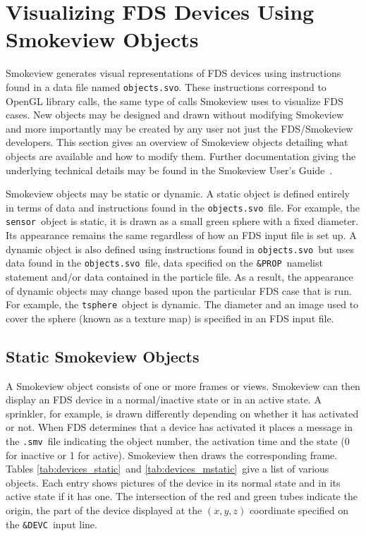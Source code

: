 %
%
\newcommand{\devicewidth}{1.5in}
\newcommand{\boxwidth}{2.75in}
\newcommand{\incgraphics}[1]{
\parbox[c]{\devicewidth}{
\vspace{0.01in}
\texttt{[image: \#1]}
\vspace{0.01in}
}
}

\section{Visualizing FDS Devices Using Smokeview Objects}
Smokeview generates visual representations of FDS devices using instructions found in a data file named
{\tt objects.svo}.  These instructions correspond to OpenGL library calls, the same type of calls Smokeview
uses to visualize FDS cases.  New objects may be designed and drawn without modifying Smokeview and more
importantly may be created by any user not just the FDS/Smokeview developers.  This section gives an overview
of Smokeview objects detailing what objects are available and how to modify them.  Further documentation
giving the underlying technical details may be found in the Smokeview User's Guide~\cite{Smokeview_Users_Guide_5}.

Smokeview objects may be static or dynamic.  A static object is defined entirely in terms of data and instructions
found in the {\tt objects.svo}\ file.  For example, the {\tt sensor}\ object is static, it is drawn as a small green
sphere with a fixed diameter.  Its appearance remains 
the same regardless of how an FDS input file is set up.  A dynamic object is also defined using instructions found in 
{\tt objects.svo}\ but uses data found in the {\tt objects.svo}\ file, data specified on the {\tt \&PROP}\ namelist statement and/or 
data contained in the particle file.  As a result, the appearance of dynamic objects may change based upon the particular FDS case that 
is run.   For example, the {\tt tsphere}\ object is dynamic.  The diameter and an image used to cover the sphere (known 
as a texture map) is specified in an FDS input file.


\subsection{Static Smokeview Objects}

A Smokeview object consists of one or more frames or views.  Smokeview can then display an FDS device in a
normal/inactive state or in an active state.  A sprinkler, for example, is drawn differently depending on
whether it has activated or not.  When FDS determines that a device has activated it places a message in the
{\tt .smv}\ file indicating the object number, the activation time and the state (0 for inactive or 1 for active).
Smokeview then draws the corresponding frame.  Tables \ref{tab:devices_static}\ and \ref{tab:devices_mstatic}\
give a list of various objects.  Each entry shows pictures of the device in its normal state and
in its active state if it has one.  The intersection of the red and green tubes indicate the origin,
the part of the device displayed at the $(x,y,z)$ coordinate specified on the {\tt \&DEVC}\ input line.

